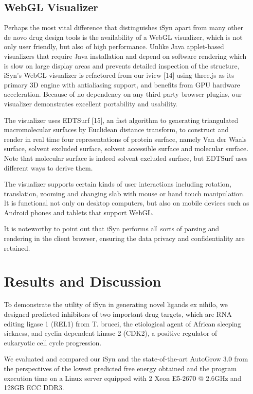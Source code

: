 \subsection{WebGL Visualizer}

Perhaps the most vital difference that distinguishes iSyn apart from many other de novo drug design tools is the availability of a WebGL visualizer, which is not only user friendly, but also of high performance. Unlike Java applet-based visualizers that require Java installation and depend on software rendering which is slow on large display areas and prevents detailed inspection of the structure, iSyn’s WebGL visualizer is refactored from our iview [14] using three.js as its primary 3D engine with antialiasing support, and benefits from GPU hardware acceleration. Because of no dependency on any third-party browser plugins, our visualizer demonstrates excellent portability and usability.

The visualizer uses EDTSurf [15], an fast algorithm to generating triangulated macromolecular surfaces by Euclidean distance transform, to construct and render in real time four representations of protein surface, namely Van der Waals surface, solvent excluded surface, solvent accessible surface and molecular surface. Note that molecular surface is indeed solvent excluded surface, but EDTSurf uses different ways to derive them.

The visualizer supports certain kinds of user interactions including rotation, translation, zooming and changing slab with mouse or hand touch manipulation. It is functional not only on desktop computers, but also on mobile devices such as Android phones and tablets that support WebGL.

It is noteworthy to point out that iSyn performs all sorts of parsing and rendering in the client browser, ensuring the data privacy and confidentiality are retained.

\section{Results and Discussion}

To demonstrate the utility of iSyn in generating novel ligands ex nihilo, we designed predicted inhibitors of two important drug targets, which are RNA editing ligase 1 (REL1) from T. brucei, the etiological agent of African sleeping sickness, and cyclin-dependent kinase 2 (CDK2), a positive regulator of eukaryotic cell cycle progression.

We evaluated and compared our iSyn and the state-of-the-art AutoGrow 3.0 from the perspectives of the lowest predicted free energy obtained and the program execution time on a Linux server equipped with 2 Xeon E5-2670 @ 2.6GHz and 128GB ECC DDR3.

